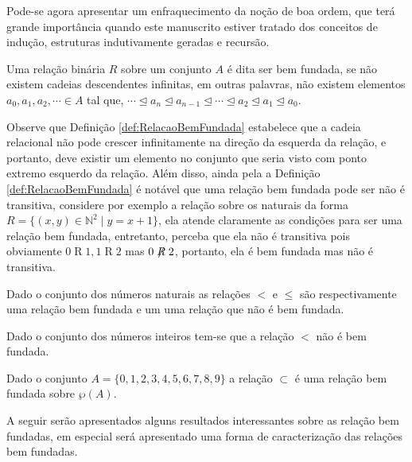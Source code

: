 Pode-se agora apresentar um enfraquecimento da noção de boa ordem, que terá grande importância quando este manuscrito estiver tratado dos conceitos de indução, estruturas indutivamente geradas e recursão.

\begin{definicao}\label{def:RelacaoBemFundada}
	Uma relação binária $R$ sobre um conjunto $A$ é dita ser bem fundada, se não existem cadeias descendentes infinitas, em outras palavras, não existem elementos $a_0, a_1, a_2, \cdots \in A$ tal que, $\cdots \unlhd a_n \unlhd a_{n-1} \unlhd \cdots \unlhd a_2 \unlhd a_1 \unlhd a_0$.  
\end{definicao}

Observe que Definição \ref{def:RelacaoBemFundada} estabelece que a cadeia relacional não pode crescer infinitamente na direção da esquerda da relação, e portanto, deve existir um elemento no conjunto que seria visto com ponto extremo esquerdo da relação. Além disso, ainda pela a Definição \ref{def:RelacaoBemFundada} é notável que uma relação bem fundada pode ser não é transitiva, considere por exemplo a relação sobre os naturais da forma $R = \{(x, y) \in \mathbb{N}^2 \mid y = x + 1\}$, ela atende claramente as condições para ser uma relação bem fundada, entretanto, perceba que ela não é transitiva pois obviamente $0 \mathrel{R}1, 1 \mathrel{R} 2$ mas $0 \centernot{R} 2$, portanto, ela é bem fundada mas não é transitiva.

\begin{exemplo}\label{exe:RelacaoBemFundada1}
	Dado o conjunto dos números naturais as relações $<$ e $\leq$ são respectivamente uma relação bem fundada e um uma relação que não é bem fundada.
\end{exemplo}

\begin{exemplo}\label{exe:RelacaoBemFundada2}
	Dado o conjunto dos números inteiros tem-se que a relação $<$ não é bem fundada.
\end{exemplo}

\begin{exemplo}\label{exe:RelacaoBemFundada3}
	Dado o conjunto $A = \{0, 1, 2, 3, 4, 5, 6, 7, 8, 9\}$ a relação $\subset$ é uma relação bem fundada sobre $\wp(A)$.
\end{exemplo}

A seguir serão apresentados alguns resultados interessantes sobre as relação bem fundadas, em especial será apresentado uma forma de caracterização das relações bem fundadas.

